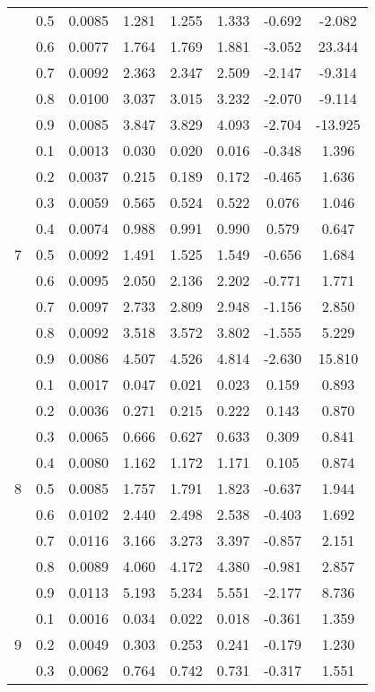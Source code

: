 \documentclass[11pt,a4paper]{report}
\begin{document}
\begin{longtable}{ | c | c || c | c | c | c | c | c | }
 & 0.5 & 0.0085 & 1.281 & 1.255 & 1.333 & -0.692 & -2.082 \\
 & 0.6 & 0.0077 & 1.764 & 1.769 & 1.881 & -3.052 & 23.344 \\
 & 0.7 & 0.0092 & 2.363 & 2.347 & 2.509 & -2.147 & -9.314 \\
 & 0.8 & 0.0100 & 3.037 & 3.015 & 3.232 & -2.070 & -9.114 \\
 & 0.9 & 0.0085 & 3.847 & 3.829 & 4.093 & -2.704 & -13.925 \\
 \hline
\multirow{9}{*}{7} & 0.1 & 0.0013 & 0.030 & 0.020 & 0.016 & -0.348 & 1.396 \\
 & 0.2 & 0.0037 & 0.215 & 0.189 & 0.172 & -0.465 & 1.636 \\
 & 0.3 & 0.0059 & 0.565 & 0.524 & 0.522 & 0.076 & 1.046 \\
 & 0.4 & 0.0074 & 0.988 & 0.991 & 0.990 & 0.579 & 0.647 \\
 & 0.5 & 0.0092 & 1.491 & 1.525 & 1.549 & -0.656 & 1.684 \\
 & 0.6 & 0.0095 & 2.050 & 2.136 & 2.202 & -0.771 & 1.771 \\
 & 0.7 & 0.0097 & 2.733 & 2.809 & 2.948 & -1.156 & 2.850 \\
 & 0.8 & 0.0092 & 3.518 & 3.572 & 3.802 & -1.555 & 5.229 \\
 & 0.9 & 0.0086 & 4.507 & 4.526 & 4.814 & -2.630 & 15.810 \\
 \hline
\multirow{9}{*}{8} & 0.1 & 0.0017 & 0.047 & 0.021 & 0.023 & 0.159 & 0.893 \\
 & 0.2 & 0.0036 & 0.271 & 0.215 & 0.222 & 0.143 & 0.870 \\
 & 0.3 & 0.0065 & 0.666 & 0.627 & 0.633 & 0.309 & 0.841 \\
 & 0.4 & 0.0080 & 1.162 & 1.172 & 1.171 & 0.105 & 0.874 \\
 & 0.5 & 0.0085 & 1.757 & 1.791 & 1.823 & -0.637 & 1.944 \\
 & 0.6 & 0.0102 & 2.440 & 2.498 & 2.538 & -0.403 & 1.692 \\
 & 0.7 & 0.0116 & 3.166 & 3.273 & 3.397 & -0.857 & 2.151 \\
 & 0.8 & 0.0089 & 4.060 & 4.172 & 4.380 & -0.981 & 2.857 \\
 & 0.9 & 0.0113 & 5.193 & 5.234 & 5.551 & -2.177 & 8.736 \\
 \hline
\multirow{9}{*}{9} & 0.1 & 0.0016 & 0.034 & 0.022 & 0.018 & -0.361 & 1.359 \\
 & 0.2 & 0.0049 & 0.303 & 0.253 & 0.241 & -0.179 & 1.230 \\
 & 0.3 & 0.0062 & 0.764 & 0.742 & 0.731 & -0.317 & 1.551 \\

\end{longtable}
\end{document}
